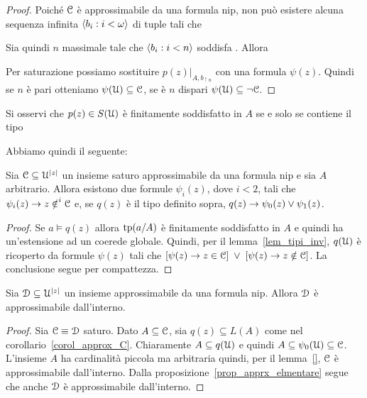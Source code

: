 \begin{proof}
Poich\'e $\EuScript C$ \`e approssimabile da una formula nip, non pu\`o esistere alcuna sequenza infinita $\langle b_i:i<\omega\rangle$ di tuple tali che


Sia quindi $n$ massimale tale che $\langle b_i:i<n\rangle$ soddisfa . Allora 


Per saturazione possiamo sostituire $p(z)|_{A,b_{\restriction n}}$ con una formula $\psi(z)$. Quindi se $n$ \`e pari otteniamo $\psi(\EuScript U)\subseteq\EuScript C$, se \`e $n$ dispari $\psi(\EuScript U)\subseteq\neg\EuScript C$.
\end{proof}

Si osservi che $p(z)\in S(\EuScript U)$ \`e finitamente soddisfatto in $A$ se e solo se contiene il tipo


Abbiamo quindi il seguente:

\begin{corollary}\label{corol_approx_C}
Sia $\EuScript C\subseteq\EuScript U^{|z|}$ un insieme saturo approssimabile da una formula nip e sia $A$ arbitrario. Allora esistono due formule $\psi_i(z)$, dove $i<2$, tali che $\psi_i(z)\rightarrow z\notin^i\EuScript C$ e, se $q(z)$ \`e il tipo definito sopra,   $q(z)\rightarrow\psi_0(z)\vee\psi_1(z)$.
\end{corollary}

\begin{proof}
Se $a\models q(z)$ allora $\textrm{tp}(a/A)$ \`e finitamente soddisfatto in $A$ e quindi ha un'estensione ad un coerede globale. Quindi, per il lemma~\ref{lem_tipi_inv}, $q(\EuScript U)$ \`e ricoperto da formule $\psi(z)$ tali che $[\psi(z)\rightarrow z\in\EuScript C]\;\vee\;[\psi(z)\rightarrow z\notin\EuScript C]$. La conclusione segue per compattezza.
\end{proof}

\begin{corollary}\label{coroll_nip_qd}
Sia $\EuScript D\subseteq\EuScript U^{|z|}$ un insieme approssimabile da una formula nip. Allora $\EuScript D$ \`e approssimabile dall'interno.
\end{corollary}
\begin{proof}
Sia $\EuScript C\equiv\EuScript D$ saturo. Dato $A\subseteq\EuScript C$, sia $q(z)\subseteq L(A)$ come nel corollario~\ref{corol_approx_C}. Chiaramente $A\subseteq q(\EuScript U)$ e quindi $A\subseteq\psi_0(\EuScript U)\subseteq\EuScript C$. L'insieme $A$ ha cardinalit\`a piccola ma arbitraria quindi, per il lemma~\ref{}, $\EuScript C$ \`e approssimabile dall'interno. Dalla proposizione~\ref{prop_apprx_elmentare} segue che anche $\EuScript D$ \`e approssimabile dall'interno.
\end{proof}

